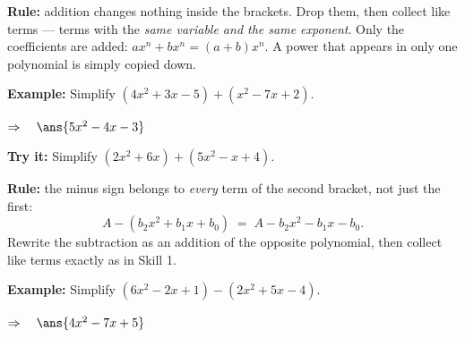 \documentclass[12pt]{article}
\begin{document}


\begin{formulabox}
\textbf{Rule:} addition changes nothing inside the brackets. Drop them, then collect like terms
--- terms with the \emph{same variable and the same exponent}.
Only the coefficients are added: $a x^n + b x^n = (a+b)x^n$. A power that appears in only one
polynomial is simply copied down.
\end{formulabox}

\begin{examplebox}
\textbf{Example:} \quad Simplify $(4x^2 + 3x - 5) + (x^2 - 7x + 2)$.

$\Rightarrow\quad \ans{5x^2 - 4x - 3}$
\end{examplebox}

\begin{tryitbox}
\textbf{Try it:} \quad Simplify $(2x^2 + 6x) + (5x^2 - x + 4)$.\\[2pt]
\end{tryitbox}


\begin{formulabox}
\textbf{Rule:} the minus sign belongs to \emph{every} term of the second bracket, not just the first:
\[
  A - (b_2x^2 + b_1x + b_0) \;=\; A - b_2x^2 - b_1x - b_0 .
\]
Rewrite the subtraction as an addition of the opposite polynomial, then collect like terms exactly
as in Skill 1.
\end{formulabox}

\begin{examplebox}
\textbf{Example:} \quad Simplify $(6x^2 - 2x + 1) - (2x^2 + 5x - 4)$.

$\Rightarrow\quad \ans{4x^2 - 7x + 5}$
\end{examplebox}
\end{document}
